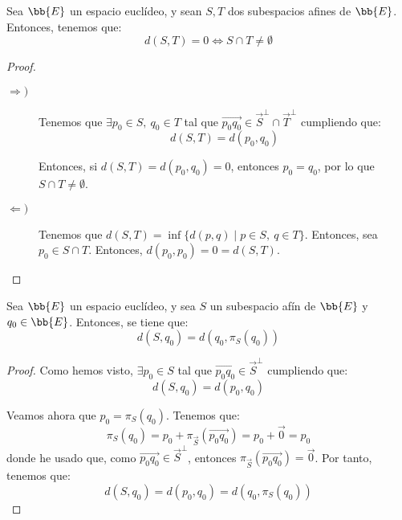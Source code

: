 \begin{coro}
    Sea $\bb{E}$ un espacio euclídeo, y sean $S,T$ dos subespacios afines de $\bb{E}$. Entonces, tenemos que:
    \begin{equation*}
        d(S,T)=0 \Longleftrightarrow S\cap T \neq \emptyset
    \end{equation*}
\end{coro}
\begin{proof}\
\begin{description}
    \item[$\Longrightarrow)$] Tenemos que $\exists p_0\in S,~ q_0\in T$ tal que $\vec{p_0q_0}\in \vec{S}^\perp\cap \vec{T}^\perp$ cumpliendo que:
    \begin{equation*}
        d(S,T)=d(p_0,q_0)
    \end{equation*}

    Entonces, si $d(S,T)=d(p_0,q_0)=0$, entonces $p_0=q_0$, por lo que $S\cap T\neq \emptyset$.

    \item[$\Longleftarrow)$] Tenemos que $d(S,T)=\inf\{d(p,q)\mid p\in S,~q\in T\}$. Entonces, sea $p_0\in S\cap T$. Entonces, $d(p_0,p_0)=0=d(S,T)$.
\end{description}
\end{proof}

\begin{coro}
    Sea $\bb{E}$ un espacio euclídeo, y sea $S$ un subespacio afín de $\bb{E}$ y $q_0\in \bb{E}$. Entonces, se tiene que:
    \begin{equation*}
        d(S,q_0)=d(q_0, \pi_S(q_0))
    \end{equation*}
\end{coro}
\begin{proof}
    Como hemos visto, $\exists p_0\in S$ tal que $\vec{p_0q_0}\in \vec{S}^\perp$ cumpliendo que:
    \begin{equation*}
        d(S,q_0)=d(p_0,q_0)
    \end{equation*}

    Veamos ahora que $p_0=\pi_S(q_0)$. Tenemos que:
    \begin{equation*}
        \pi_S(q_0) = p_0 + \pi_{\vec{S}}(\vec{p_0q_0}) = p_0 + \vec{0} = p_0
    \end{equation*}
    donde he usado que, como $\vec{p_0q_0}\in \vec{S}^\perp$, entonces $\pi_{\vec{S}}(\vec{p_0q_0})=\vec{0}$.
    Por tanto, tenemos que:
    \begin{equation*}
        d(S,q_0)=d(p_0,q_0)=d(q_0, \pi_S(q_0))
    \end{equation*}
\end{proof}

